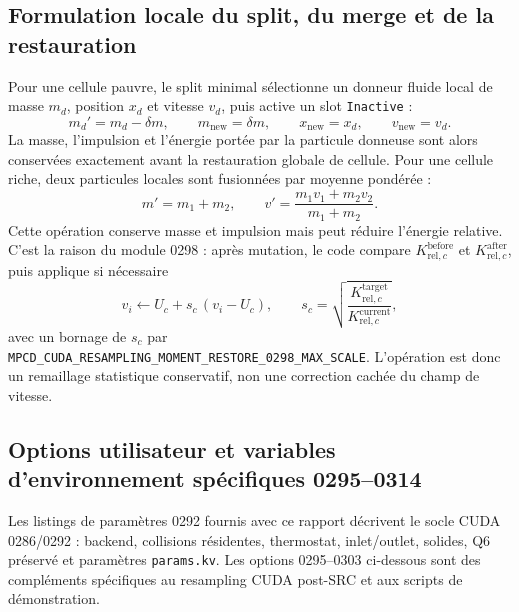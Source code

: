 \documentclass[11pt,a4paper]{article}
\begin{document}
\subsection{Formulation locale du split, du merge et de la restauration}

Pour une cellule pauvre, le split minimal sélectionne un donneur fluide local de masse $m_d$, position $x_d$ et vitesse $v_d$, puis active un slot \texttt{Inactive} :
\begin{equation}
  m_d' = m_d - \delta m, \qquad
  m_{\mathrm{new}} = \delta m, \qquad
  x_{\mathrm{new}}=x_d, \qquad
  v_{\mathrm{new}}=v_d.
\end{equation}
La masse, l'impulsion et l'énergie portée par la particule donneuse sont alors conservées exactement avant la restauration globale de cellule. Pour une cellule riche, deux particules locales sont fusionnées par moyenne pondérée :
\begin{equation}
  m' = m_1+m_2, \qquad
  v' = \frac{m_1 v_1 + m_2 v_2}{m_1+m_2}.
\end{equation}
Cette opération conserve masse et impulsion mais peut réduire l'énergie relative. C'est la raison du module 0298 : après mutation, le code compare $K_{\mathrm{rel},c}^{\mathrm{before}}$ et $K_{\mathrm{rel},c}^{\mathrm{after}}$, puis applique si nécessaire
\begin{equation}
  v_i \leftarrow U_c + s_c\,(v_i-U_c), \qquad
  s_c = \sqrt{\frac{K_{\mathrm{rel},c}^{\mathrm{target}}}{K_{\mathrm{rel},c}^{\mathrm{current}}}},
\end{equation}
avec un bornage de $s_c$ par \texttt{MPCD\_CUDA\_RESAMPLING\_MOMENT\_RESTORE\_0298\_MAX\_SCALE}. L'opération est donc un remaillage statistique conservatif, non une correction cachée du champ de vitesse.

\subsection{Options utilisateur et variables d'environnement spécifiques 0295--0314}

Les listings de paramètres 0292 fournis avec ce rapport décrivent le socle CUDA 0286/0292 : backend, collisions résidentes, thermostat, inlet/outlet, solides, Q6 préservé et paramètres \texttt{params.kv}. Les options 0295--0303 ci-dessous sont des compléments spécifiques au resampling CUDA post-SRC et aux scripts de démonstration.
\end{document}
